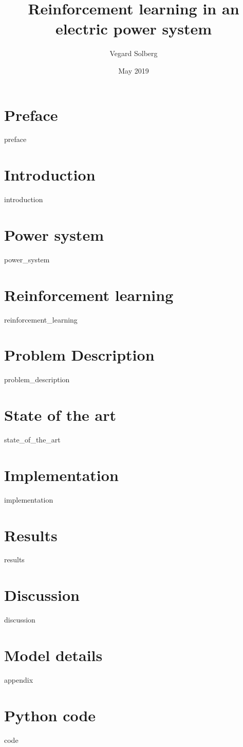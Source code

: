 \documentclass{book}
\title{Reinforcement learning in an electric power system}
\author{Vegard Solberg}
\date{May 2019}
\begin{document}
 
    \maketitle
    \frontmatter
    \chapter{Preface}
    {preface}
    
    \tableofcontents
    
    \mainmatter
    \chapter{Introduction}
    {introduction}
    
    \chapter{Power system}
    {power_system}
 
    \chapter{Reinforcement learning}
    {reinforcement_learning}
    
    \chapter{Problem Description}\label{chap:prob_description}
    {problem_description}
    
    \chapter{State of the art}
    {state_of_the_art}
    
    \chapter{Implementation}
    {implementation}
    
    
    \chapter{Results}
    {results}
    
    \chapter{Discussion}
    {discussion}
    \printbibliography

    \appendix
    \chapter{Model details}
    {appendix}
    
    \chapter{Python code}
    {code}
    
\end{document}
